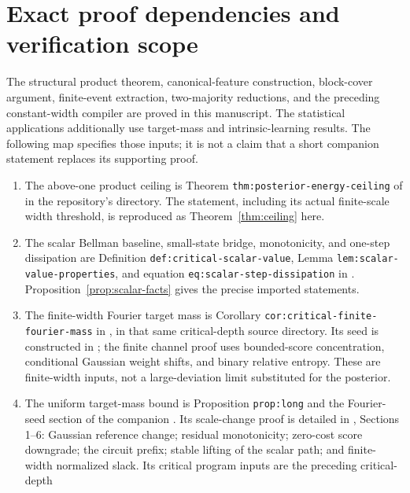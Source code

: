 \documentclass[11pt]{article}
\theoremstyle{remark}
\begin{document}
\section{Exact proof dependencies and verification scope}
\label{app:dependencies}

The structural product theorem, canonical-feature construction, block-cover
argument, finite-event extraction, two-majority reductions, and the preceding
constant-width compiler are proved in this manuscript. The statistical
applications additionally use target-mass and intrinsic-learning results.
The following map specifies those inputs; it is not a claim that a short
companion statement replaces its supporting proof.

\begin{enumerate}[leftmargin=*]
\item The above-one product ceiling is Theorem
\texttt{thm:posterior-energy-ceiling} of
 in the repository's
 directory.
The statement, including its actual finite-scale width threshold, is
reproduced as Theorem~\ref{thm:ceiling} here.
\item The scalar Bellman baseline, small-state bridge, monotonicity, and
one-step dissipation are Definition \texttt{def:critical-scalar-value},
Lemma \texttt{lem:scalar-value-properties}, and equation
\texttt{eq:scalar-step-dissipation} in
.
Proposition~\ref{prop:scalar-facts} gives the precise imported statements.
\item The finite-width Fourier target mass is Corollary
\texttt{cor:critical-finite-fourier-mass} in
, in that same critical-depth
source directory. Its seed is constructed in
; the finite channel proof
uses bounded-score concentration, conditional Gaussian weight shifts,
and binary relative entropy. These are finite-width inputs, not a
large-deviation limit substituted for the posterior.
\item The uniform target-mass bound is Proposition \texttt{prop:long}
and the Fourier-seed section of the companion
. Its scale-change proof is detailed in
, Sections 1--6: Gaussian reference
change; residual monotonicity; zero-cost score downgrade; the circuit
prefix; stable lifting of the scalar path; and finite-width normalized
slack. Its critical program inputs are the preceding critical-depth

\end{enumerate}
\end{document}

